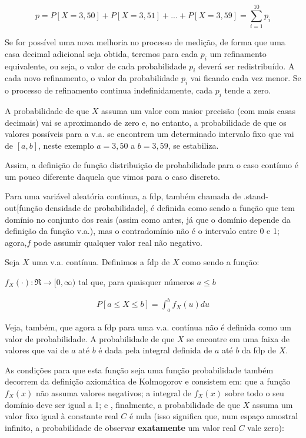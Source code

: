 \documentclass[
]{book}
\theoremstyle{definition}
\theoremstyle{definition}
\theoremstyle{definition}
\theoremstyle{remark}
\begin{document}
\[{p = P[X = 3,50] + P[X = 3,51] + ... + P[X = 3,59] = \sum_{i=1}^{10} p_i}\]

Se for possível uma nova melhoria no processo de medição, de forma que uma casa decimal adicional seja obtida, teremos para cada \(p_i\) um refinamento equivalente, ou seja, o valor de cada probabilidade \(p_i\) deverá ser redistribuído. A cada novo refinamento, o valor da probabilidade \(p_i\) vai ficando cada vez menor. Se o processo de refinamento continua indefinidamente, cada \(p_i\) tende a zero.

A probabilidade de que \(X\) assuma um valor com maior precisão (com mais casas decimais) vai se aproximando de zero e, no entanto, a probabilidade de que os valores possíveis para a v.a. se encontrem um determinado intervalo fixo que vai de \([a,b]\), neste exemplo \(a=3,50\) a \(b=3,59\), se estabiliza.

Assim, a definição de função distribuição de probabilidade para o caso contínuo é um pouco diferente daquela que vimos para o caso discreto.

Para uma variável aleatória contínua, a fdp, também chamada de .stand-out{[}função densidade de probabilidade{]}, é definida como sendo a função que tem domínio no conjunto dos reais (assim como antes, já que o domínio depende da definição da função v.a.), mas o contradomínio não é o intervalo entre 0 e 1; agora,\(f\) pode assumir qualquer valor real não negativo.

Seja \(X\) uma v.a. contínua. Definimos a fdp de \(X\) como sendo a função:

\({f_X(\cdot): \Re \rightarrow [0,\infty)}\) tal que, para quaisquer números \({a \leq b}\)

\begin{align*}
  P[a \leq X \leq b] =\int_{a}^{b} f_X(u) du
\end{align*}

Veja, também, que agora a fdp para uma v.a. contínua não é definida como um valor de probabilidade. A probabilidade de que \(X\) se encontre em uma faixa de valores que vai de \(a\) até \(b\) é dada pela integral definida de \(a\) até \(b\) da fdp de \(X\).

As condições para que esta função seja uma função probabilidade também decorrem da definição axiomática de Kolmogorov e consistem em: que a função \(f_X(x)\) não assuma valores negativos; a integral de \(f_X(x)\) sobre todo o seu domínio deve ser igual a 1; e , finalmente, a probabilidade de que \(X\) assuma um valor fixo igual à constante real \(C\) é nula (isso significa que, num espaço amostral infinito, a probabilidade de observar \textbf{exatamente} um valor real \(C\) vale zero):
\end{document}
